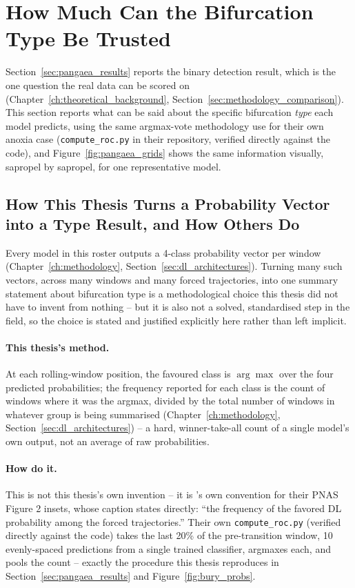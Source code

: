 \section{How Much Can the Bifurcation Type Be Trusted}
\label{sec:type_reliability}
Section~\ref{sec:pangaea_results} reports the binary detection result, which is the one question the real data can be scored on (Chapter~\ref{ch:theoretical_background}, Section~\ref{sec:methodology_comparison}). This section reports what can be said about the specific bifurcation \emph{type} each model predicts, using the same argmax-vote methodology \citet{bury2021} use for their own anoxia case (\texttt{compute\_roc.py} in their repository, verified directly against the code), and Figure~\ref{fig:pangaea_grids} shows the same information visually, sapropel by sapropel, for one representative model.

\subsection{How This Thesis Turns a Probability Vector into a Type Result, and How Others Do}
\label{sec:type_methodology}

Every model in this roster outputs a 4-class probability vector per window (Chapter~\ref{ch:methodology}, Section~\ref{sec:dl_architectures}). Turning many such vectors, across many windows and many forced trajectories, into one summary statement about bifurcation type is a methodological choice this thesis did not have to invent from nothing -- but it is also not a solved, standardised step in the field, so the choice is stated and justified explicitly here rather than left implicit.

\paragraph{This thesis's method.} At each rolling-window position, the favoured class is $\arg\max$ over the four predicted probabilities; the frequency reported for each class is the count of windows where it was the argmax, divided by the total number of windows in whatever group is being summarised (Chapter~\ref{ch:methodology}, Section~\ref{sec:dl_architectures}) -- a hard, winner-take-all count of a single model's own output, not an average of raw probabilities.

\paragraph{How \citet{bury2021} do it.} This is not this thesis's own invention -- it is \citet{bury2021}'s own convention for their PNAS Figure 2 insets, whose caption states directly: ``the frequency of the favored DL probability among the forced trajectories.'' Their own \texttt{compute\_roc.py} (verified directly against the code) takes the last 20\% of the pre-transition window, 10 evenly-spaced predictions from a single trained classifier, argmaxes each, and pools the count -- exactly the procedure this thesis reproduces in Section~\ref{sec:pangaea_results} and Figure~\ref{fig:bury_probs}.

